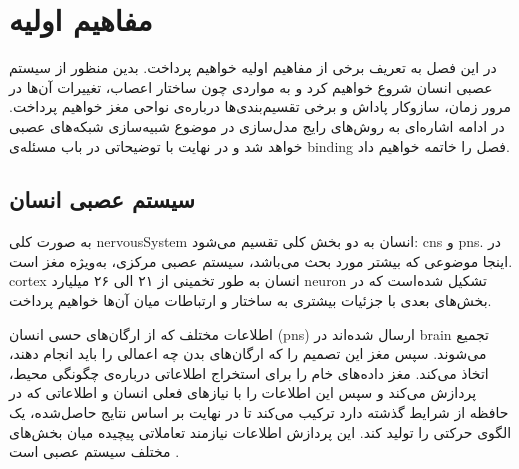 \documentclass[12pt]{report}
\begin{document}
	
	
	
	\tableofcontents
	
	
	
	\chapter{مفاهیم اولیه}
	\label{ch:Defs}
	\pagestyle{plain}
	\setcounter{page}{1}
	
	در این فصل به تعریف برخی از مفاهیم اولیه خواهیم پرداخت. بدین منظور از سیستم عصبی انسان شروع خواهیم کرد و به مواردی چون ساختار اعصاب، تغییرات آن‌ها در مرور زمان، سازوکار پاداش و برخی تقسیم‌بندی‌ها درباره‌ی نواحی مغز خواهیم پرداخت. در ادامه اشاره‌ای به روش‌‌های رایج مدل‌سازی در موضوع شبیه‌سازی شبکه‌های عصبی خواهد شد و در نهایت با توضیحاتی در باب مسئله‌ی \gls{binding} فصل را خاتمه خواهیم داد.
	
	\section{سیستم عصبی انسان}
	
	به صورت کلی \gls{nervousSystem} انسان به دو بخش کلی تقسیم می‌شود: \gls{cns}
	و \gls{pns}.
	در اینجا موضوعی که بیشتر مورد بحث می‌باشد، سیستم عصبی مرکزی، به‌ویژه مغز است. \gls{cortex} انسان به طور تخمینی از ۲۱ الی ۲۶ میلیارد \gls{neuron} تشکیل شده‌است
	\cite{Pelvig2008-vh}
	که در بخش‌های بعدی با جزئیات بیشتری به ساختار و ارتباطات میان آن‌ها خواهیم پرداخت.
	
	
	اطلاعات مختلف که از ارگان‌های حسی انسان (\gls{pns}) ارسال شده‌اند در \gls{brain} تجمیع می‌شوند. سپس مغز این تصمیم را که ارگان‌های بدن چه اعمالی را باید انجام دهند، اتخاذ می‌کند. مغز داده‌های خام را برای استخراج اطلاعاتی درباره‌ی چگونگی محیط، پردازش می‌کند و سپس این اطلاعات را با نیاز‌های فعلی انسان و اطلاعاتی که در حافظه از شرایط گذشته دارد ترکیب می‌کند تا در نهایت بر اساس نتایج حاصل‌شده، یک الگوی حرکتی را تولید ‌کند. این پردازش اطلاعات نیازمند تعاملاتی پیچیده میان بخش‌های مختلف سیستم عصبی است 
	\cite{carew2000}.
	
\end{document}
